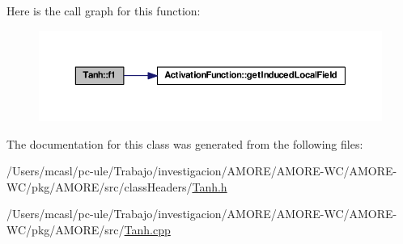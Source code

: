 Here is the call graph for this function:\nopagebreak
\begin{figure}[H]
\begin{center}
\leavevmode
\includegraphics[width=378pt]{class_tanh_af723894488a3c1adb7dcdefbcc4b360a_cgraph}
\end{center}
\end{figure}




The documentation for this class was generated from the following files:\begin{DoxyCompactItemize}
\item 
/Users/mcasl/pc-\/ule/Trabajo/investigacion/AMORE/AMORE-\/WC/AMORE-\/WC/pkg/AMORE/src/classHeaders/\hyperlink{_tanh_8h}{Tanh.h}\item 
/Users/mcasl/pc-\/ule/Trabajo/investigacion/AMORE/AMORE-\/WC/AMORE-\/WC/pkg/AMORE/src/\hyperlink{_tanh_8cpp}{Tanh.cpp}\end{DoxyCompactItemize}

